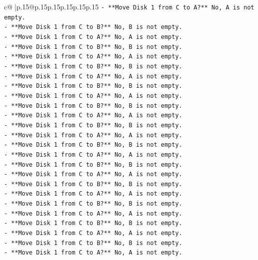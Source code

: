 \documentclass{article}
\begin{document}
{\begin{supertabular}{c@{$\;$}|p{.15\linewidth}@{}p{.15\linewidth}p{.15\linewidth}p{.15\linewidth}p{.15\linewidth}p{.15\linewidth}}
{{{\texttt{{-} **Move Disk 1 from C to A?** No, A is not empty.} \\
\texttt{{-} **Move Disk 1 from C to B?** No, B is not empty.} \\
\texttt{{-} **Move Disk 1 from C to A?** No, A is not empty.} \\
\texttt{{-} **Move Disk 1 from C to B?** No, B is not empty.} \\
\texttt{{-} **Move Disk 1 from C to A?** No, A is not empty.} \\
\texttt{{-} **Move Disk 1 from C to B?** No, B is not empty.} \\
\texttt{{-} **Move Disk 1 from C to A?** No, A is not empty.} \\
\texttt{{-} **Move Disk 1 from C to B?** No, B is not empty.} \\
\texttt{{-} **Move Disk 1 from C to A?** No, A is not empty.} \\
\texttt{{-} **Move Disk 1 from C to B?** No, B is not empty.} \\
\texttt{{-} **Move Disk 1 from C to A?** No, A is not empty.} \\
\texttt{{-} **Move Disk 1 from C to B?** No, B is not empty.} \\
\texttt{{-} **Move Disk 1 from C to A?** No, A is not empty.} \\
\texttt{{-} **Move Disk 1 from C to B?** No, B is not empty.} \\
\texttt{{-} **Move Disk 1 from C to A?** No, A is not empty.} \\
\texttt{{-} **Move Disk 1 from C to B?** No, B is not empty.} \\
\texttt{{-} **Move Disk 1 from C to A?** No, A is not empty.} \\
\texttt{{-} **Move Disk 1 from C to B?** No, B is not empty.} \\
\texttt{{-} **Move Disk 1 from C to A?** No, A is not empty.} \\
\texttt{{-} **Move Disk 1 from C to B?** No, B is not empty.} \\
\texttt{{-} **Move Disk 1 from C to A?** No, A is not empty.} \\
\texttt{{-} **Move Disk 1 from C to B?** No, B is not empty.} \\
\texttt{{-} **Move Disk 1 from C to A?** No, A is not empty.} \\
\texttt{{-} **Move Disk 1 from C to B?** No, B is not empty.} \\
\texttt{{-} **Move Disk 1 from C to A?** No, A is not empty.} \\
}}}
\end{supertabular}}
\end{document}
